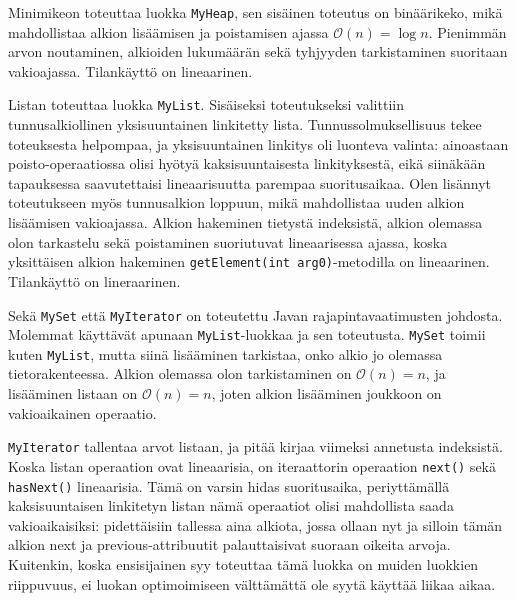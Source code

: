 \documentclass[10pt,a4paper]{article}
\begin{document}
Minimikeon toteuttaa luokka \texttt{MyHeap}, sen sisäinen toteutus on binäärikeko, mikä mahdollistaa alkion lisäämisen ja poistamisen ajassa $\mathcal{O}(n) = \log n$. Pienimmän arvon noutaminen, alkioiden lukumäärän sekä tyhjyyden tarkistaminen suoritaan vakioajassa. Tilankäyttö on lineaarinen.

Listan toteuttaa luokka \texttt{MyList}. Sisäiseksi toteutukseksi valittiin tunnusalkiollinen yksisuuntainen linkitetty lista. Tunnussolmuksellisuus tekee toteuksesta helpompaa, ja yksisuuntainen linkitys oli luonteva valinta: ainoastaan poisto-operaatiossa olisi hyötyä kaksisuuntaisesta linkityksestä, eikä siinäkään tapauksessa saavutettaisi lineaarisuutta parempaa suoritusaikaa. Olen lisännyt toteutukseen myös tunnusalkion loppuun, mikä mahdollistaa uuden alkion lisäämisen vakioajassa. Alkion hakeminen tietystä indeksistä, alkion olemassa olon tarkastelu sekä poistaminen suoriutuvat lineaarisessa ajassa, koska yksittäisen alkion hakeminen \texttt{getElement(int arg0)}-metodilla on lineaarinen. Tilankäyttö on lineraarinen.

Sekä \texttt{MySet} että \texttt{MyIterator} on toteutettu Javan rajapintavaatimusten johdosta. Molemmat käyttävät apunaan \texttt{MyList}-luokkaa ja sen toteutusta. \texttt{MySet} toimii kuten \texttt{MyList}, mutta siinä lisääminen tarkistaa, onko alkio jo olemassa tietorakenteessa. Alkion olemassa olon tarkistaminen on $\mathcal{O}(n) = n$, ja lisääminen listaan on $\mathcal{O}(n) = n$, joten alkion lisääminen joukkoon on vakioaikainen operaatio.

\texttt{MyIterator} tallentaa arvot listaan, ja pitää kirjaa viimeksi annetusta indeksistä. Koska listan operaation ovat lineaarisia, on iteraattorin operaation \texttt{next()} sekä \texttt{hasNext()} lineaarisia. Tämä on varsin hidas suoritusaika, periyttämällä kaksisuuntaisen linkitetyn listan nämä operaatiot olisi mahdollista saada vakioaikaisiksi: pidettäisiin tallessa aina alkiota, jossa ollaan nyt ja silloin tämän alkion next ja previous-attribuutit palauttaisivat suoraan oikeita arvoja. Kuitenkin, koska ensisijainen syy toteuttaa  tämä luokka on muiden luokkien riippuvuus, ei luokan optimoimiseen välttämättä ole syytä käyttää liikaa aikaa.

\end{document}
